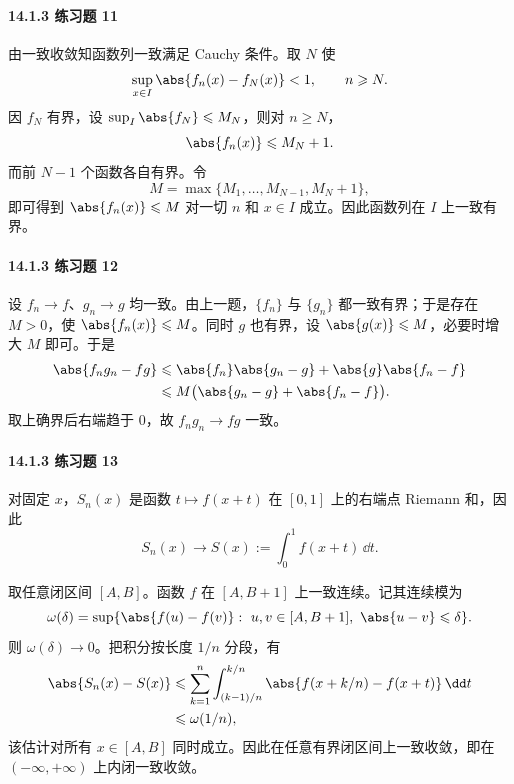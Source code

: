 \paragraph{14.1.3 练习题 11}
\begin{xsolution}
由一致收敛知函数列一致满足 Cauchy 条件。取 $N$ 使
\[
  \sup_{x\in I}\abs{f_n(x)-f_N(x)}<1,
  \qquad n\geqslant N.
\]
因 $f_N$ 有界，设 $\sup_I\abs{f_N}\leqslant M_N$，则对 $n\geqslant N$，
\[
  \abs{f_n(x)}\leqslant M_N+1.
\]
而前 $N-1$ 个函数各自有界。令
\[
  M=\max\{M_1,\ldots,M_{N-1},M_N+1\},
\]
即可得到 $\abs{f_n(x)}\leqslant M$ 对一切 $n$ 和 $x\in I$ 成立。因此函数列在 $I$ 上一致有界。
\end{xsolution}

\paragraph{14.1.3 练习题 12}
\begin{xsolution}
设 $f_n\to f$、$g_n\to g$ 均一致。由上一题，$\{f_n\}$ 与 $\{g_n\}$ 都一致有界；于是存在 $M>0$，使 $\abs{f_n(x)}\leqslant M$。同时 $g$ 也有界，设 $\abs{g(x)}\leqslant M$，必要时增大 $M$ 即可。于是
\[
\begin{aligned}
  \abs{f_ng_n-fg}
  &\leqslant\abs{f_n}\abs{g_n-g}+\abs{g}\abs{f_n-f}\\
  &\leqslant M\bigl(\abs{g_n-g}+\abs{f_n-f}\bigr).
\end{aligned}
\]
取上确界后右端趋于 $0$，故 $f_ng_n\to fg$ 一致。
\end{xsolution}

\paragraph{14.1.3 练习题 13}
\begin{xsolution}
对固定 $x$，$S_n(x)$ 是函数 $t\mapsto f(x+t)$ 在 $[0,1]$ 上的右端点 Riemann 和，因此
\[
  S_n(x)\to S(x):=\int_0^1f(x+t)\,\dd t.
\]

取任意闭区间 $[A,B]$。函数 $f$ 在 $[A,B+1]$ 上一致连续。记其连续模为
\[
  \omega(\delta)=\sup\{\abs{f(u)-f(v)}:\ u,v\in[A,B+1],\ \abs{u-v}\leqslant\delta\}.
\]
则 $\omega(\delta)\to0$。把积分按长度 $1/n$ 分段，有
\[
\begin{aligned}
  \abs{S_n(x)-S(x)}
  &\leqslant\sum_{k=1}^n\int_{(k-1)/n}^{k/n}
    \abs{f(x+k/n)-f(x+t)}\,\dd t\\
  &\leqslant\omega(1/n),
\end{aligned}
\]
该估计对所有 $x\in[A,B]$ 同时成立。因此在任意有界闭区间上一致收敛，即在 $(-\infty,+\infty)$ 上内闭一致收敛。
\end{xsolution}

